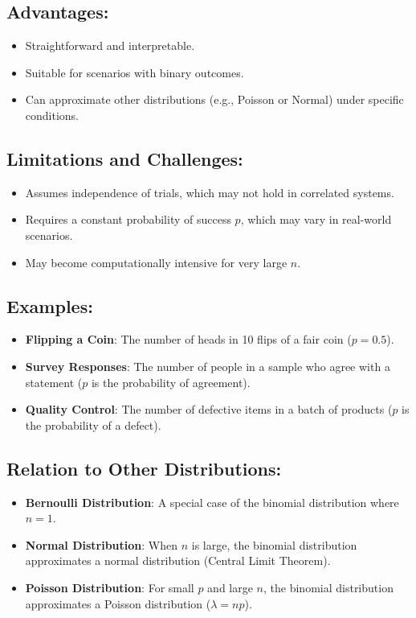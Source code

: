 \subsection*{Advantages:}
\begin{itemize}
    \item Straightforward and interpretable.
    \item Suitable for scenarios with binary outcomes.
    \item Can approximate other distributions (e.g., Poisson or Normal) under specific conditions.
\end{itemize}

\subsection*{Limitations and Challenges:}
\begin{itemize}
    \item Assumes independence of trials, which may not hold in correlated systems.
    \item Requires a constant probability of success $p$, which may vary in real-world scenarios.
    \item May become computationally intensive for very large $n$.
\end{itemize}

\subsection*{Examples:}
\begin{itemize}
    \item \textbf{Flipping a Coin}: The number of heads in 10 flips of a fair coin ($p = 0.5$).
    \item \textbf{Survey Responses}: The number of people in a sample who agree with a statement ($p$ is the probability of agreement).
    \item \textbf{Quality Control}: The number of defective items in a batch of products ($p$ is the probability of a defect).
\end{itemize}

\subsection*{Relation to Other Distributions:}
\begin{itemize}
    \item \textbf{Bernoulli Distribution}: A special case of the binomial distribution where $n = 1$.
    \item \textbf{Normal Distribution}: When $n$ is large, the binomial distribution approximates a normal distribution (Central Limit Theorem).
    \item \textbf{Poisson Distribution}: For small $p$ and large $n$, the binomial distribution approximates a Poisson distribution ($\lambda = np$).
\end{itemize}

